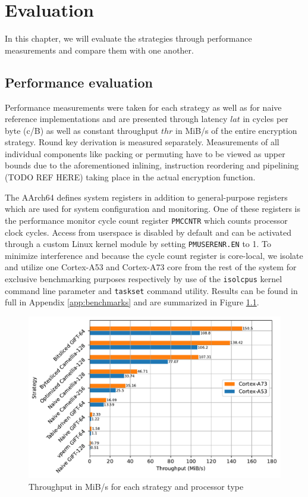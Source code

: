 \chapter{Evaluation}

In this chapter, we will evaluate the strategies through performance
measurements and compare them with one another.

\section{Performance evaluation}

Performance measurements were taken for each strategy as well as for naive
reference implementations and are presented through latency $lat$ in cycles per
byte (c/B) as well as constant throughput $thr$ in MiB/s of the entire
encryption strategy. Round key derivation is measured separately. Measurements
of all individual components like packing or permuting have to be viewed as
upper bounds due to the aforementioned inlining, instruction reordering and
pipelining (TODO REF HERE) taking place in the actual encryption function.

The AArch64 defines system registers in addition to general-purpose registers
which are used for system configuration and monitoring. One of these registers
is the performance monitor cycle count register \texttt{PMCCNTR} which counts
processor clock cycles. Access from userspace is disabled by default and can be
activated through a custom Linux kernel module by setting \texttt{PMUSERENR.EN}
to 1. To minimize interference and because the cycle count register is
core-local, we isolate and utilize one Cortex-A53 and Cortex-A73 core from the
rest of the system for exclusive benchmarking purposes respectively by use of
the \texttt{isolcpus} kernel command line parameter and \texttt{taskset}
command utility. Results can be found in full in Appendix \ref{app:benchmarks}
and are summarized in Figure \ref{figure:benchmark}.

\begin{figure}[h!]
    \centering
    \includegraphics[width=\textwidth]{Figures/benchmark_plot.pdf}
    \caption{Throughput in MiB/s for each strategy and processor type}
    \label{figure:benchmark}
\end{figure}

